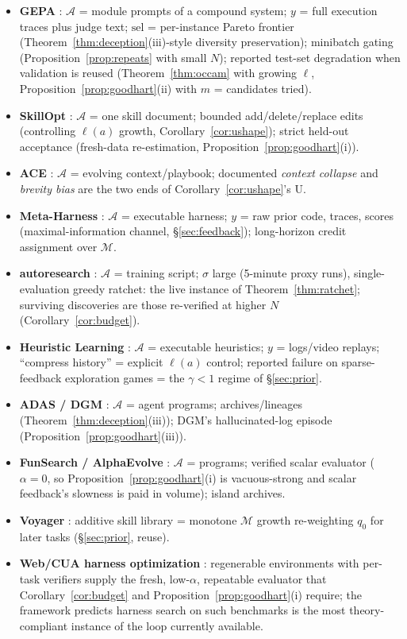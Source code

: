 \documentclass{article}
\theoremstyle{plain}
\theoremstyle{definition}
\theoremstyle{remark}
\newcommand{\A}{\mathcal{A}}
\newcommand{\M}{\mathcal{M}}
\newcommand{\sel}{\mathrm{sel}}
\newcommand{\len}{\ell}
\begin{document}
\begin{itemize}\itemsep2pt
\item \textbf{GEPA} \cite{agrawal2025gepa}: $\A$ = module prompts of a compound system; $y$ = full execution traces plus judge text; $\sel$ = per-instance Pareto frontier (Theorem~\ref{thm:deception}(iii)-style diversity preservation); minibatch gating (Proposition~\ref{prop:repeats} with small $N$); reported test-set degradation when validation is reused (Theorem~\ref{thm:occam} with growing $\len$, Proposition~\ref{prop:goodhart}(ii) with $m$ = candidates tried).
\item \textbf{SkillOpt} \cite{yang2026skillopt}: $\A$ = one skill document; bounded add/delete/replace edits (controlling $\len(a)$ growth, Corollary~\ref{cor:ushape}); strict held-out acceptance (fresh-data re-estimation, Proposition~\ref{prop:goodhart}(i)).
\item \textbf{ACE} \cite{zhang2025ace}: $\A$ = evolving context/playbook; documented \emph{context collapse} and \emph{brevity bias} are the two ends of Corollary~\ref{cor:ushape}'s U.
\item \textbf{Meta-Harness} \cite{lee2026metaharness}: $\A$ = executable harness; $y$ = raw prior code, traces, scores (maximal-information channel, \S\ref{sec:feedback}); long-horizon credit assignment over $\M$.
\item \textbf{autoresearch} \cite{karpathy2026autoresearch}: $\A$ = training script; $\sigma$ large (5-minute proxy runs), single-evaluation greedy ratchet: the live instance of Theorem~\ref{thm:ratchet}; surviving discoveries are those re-verified at higher $N$ (Corollary~\ref{cor:budget}).
\item \textbf{Heuristic Learning} \cite{weng2026hl}: $\A$ = executable heuristics; $y$ = logs/video replays; ``compress history'' = explicit $\len(a)$ control; reported failure on sparse-feedback exploration games = the $\gamma < 1$ regime of \S\ref{sec:prior}.
\item \textbf{ADAS / DGM} \cite{hu2025adas, zhang2025dgm}: $\A$ = agent programs; archives/lineages (Theorem~\ref{thm:deception}(iii)); DGM's hallucinated-log episode (Proposition~\ref{prop:goodhart}(iii)).
\item \textbf{FunSearch / AlphaEvolve} \cite{romeraparedes2024funsearch, novikov2025alphaevolve}: $\A$ = programs; verified scalar evaluator ($\alpha = 0$, so Proposition~\ref{prop:goodhart}(i) is vacuous-strong and scalar feedback's slowness is paid in volume); island archives.
\item \textbf{Voyager} \cite{wang2023voyager}: additive skill library = monotone $\M$ growth re-weighting $q_0$ for later tasks (\S\ref{sec:prior}, reuse).
\item \textbf{Web/CUA harness optimization} \cite{anonymous2026shopgym, zhou2024webarena}: regenerable environments with per-task verifiers supply the fresh, low-$\alpha$, repeatable evaluator that Corollary~\ref{cor:budget} and Proposition~\ref{prop:goodhart}(i) require; the framework predicts harness search on such benchmarks is the most theory-compliant instance of the loop currently available.
\end{itemize}
\end{document}

